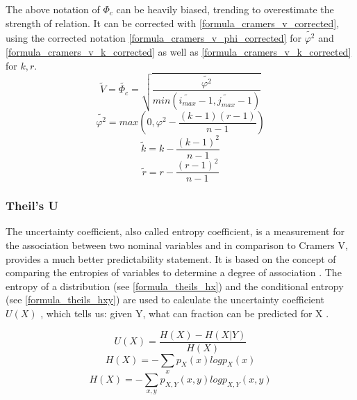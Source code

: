 \smallskip

The above notation of $\Phi_c$ can be heavily biased, trending to overestimate the strength of relation. It can be corrected with \cref{formula_cramers_v_corrected}, using the corrected notation \cref{formula_cramers_v_phi_corrected} for $\tilde{\varphi^2}$ and \cref{formula_cramers_v_k_corrected} as well as \cref{formula_cramers_v_k_corrected} for $k,r$. \parencite{Bergsma2013}
\smallskip
\begin{equation}
\label{formula_cramers_v_corrected}
	\tilde{V} = \tilde{\Phi_c} = \sqrt{\frac{\tilde{\varphi^2}}{min(\tilde{i_{max}}-1,\tilde{j_{max}}-1)}}
\end{equation}
\begin{equation}
\label{formula_cramers_v_phi_corrected}
	\tilde{\varphi^2} = max(0,\varphi^2 - \frac{(k-1)(r-1)}{n-1})
\end{equation}
\begin{equation}
\label{formula_cramers_v_k_corrected}
	\tilde{k} = k - \frac{(k-1)^2}{n-1}
\end{equation}
\begin{equation}
\label{formula_cramers_v_r_corrected}
	\tilde{r} = r - \frac{(r-1)^2}{n-1}
\end{equation}

\bigskip

\subsubsection{Theil’s U}
The uncertainty coefficient, also called entropy coefficient, is a measurement for the association between two nominal variables and in comparison to Cramers V, provides a much better predictability statement. It is based on the concept of comparing the entropies of variables to determine a degree of association \parencite{Hoang2019}. The entropy of a distribution (see \cref{formula_theils_hx}) and the conditional entropy (see \cref{formula_theils_hxy}) are used to calculate the uncertainty coefficient $U(X)$ \parencite{Glen2017,Glen2018}, which tells us: given Y, what can fraction can be predicted for X \parencite{Hoang2019}.

\smallskip
\begin{equation}
\label{formula_theils}
	U(X) = \frac{H(X)-H(X|Y)}{H(X)}
\end{equation}
\begin{equation}
\label{formula_theils_hx}
	H(X) = -\sum_{x} p_{X}(x)log p_X(x)
\end{equation}
\begin{equation}
\label{formula_theils_hxy}
	H(X) = -\sum_{x,y} p_{X,Y}(x,y)log p_{X,Y}(x,y)
\end{equation}

